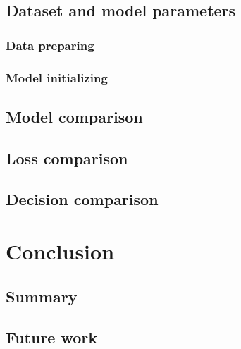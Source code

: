 \documentclass[journal]{IEEEtran}
\begin{document}
\subsection{Dataset and model parameters}

\subsubsection{Data preparing}

\subsubsection{Model initializing}

\subsection{Model comparison}



\subsection{Loss comparison}

\subsection{Decision comparison}


\section{Conclusion}
\subsection{Summary}

\subsection{Future work}
\end{document}
